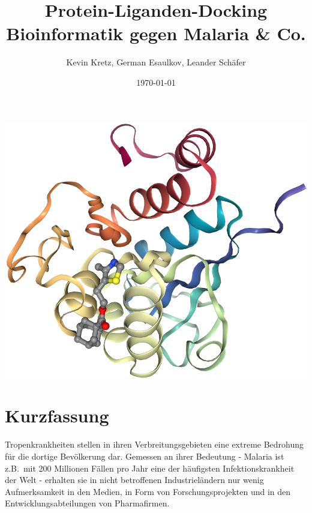 \documentclass[10pt]{article}
\title{Protein-Liganden-Docking\\\large{Bioinformatik gegen Malaria \& Co.}}
\author{Kevin Kretz, German Esaulkov, Leander Schäfer}
\date{\today}
\begin{document}


    \maketitle

    \includegraphics[width=\linewidth]{Titelbild}

    \pagebreak


    \section{Kurzfassung}\label{sec:kurzfassung}

    Tropenkrankheiten stellen in ihren Verbreitungsgebieten eine extreme Bedrohung für die dortige Bevölkerung dar.
    Gemessen an ihrer Bedeutung - Malaria ist z.B.\ mit 200 Millionen Fällen pro Jahr eine der häufigsten
    Infektionskrankheit der Welt - erhalten sie in nicht betroffenen Industrieländern nur wenig Aufmerksamkeit in den
    Medien, in Form von Forschungsprojekten und in den Entwicklungsabteilungen von Pharmafirmen.
\end{document}
